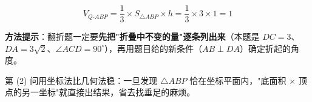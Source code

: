 \begin{answer}
\nopagebreak[4]
\[V_{Q\text{-}ABP}=\frac13\times S_{\triangle ABP}\times h=\frac13\times3\times1=1\]

\begin{gktip}
\textbf{方法提示}：翻折题一定要\textbf{先把"折叠中不变的量"逐条列出来}（本题是 $DC=3$、$DA=3\sqrt2$、$\angle ACD=90^\circ$），再用题目给的新条件（$AB\perp DA$）确定折起的角度。

第 (2) 问用坐标法比几何法稳：一旦发现 $\triangle ABP$ 恰在坐标平面内，"底面积 $\times$ 顶点的另一坐标"就直接出结果，省去找垂足的麻烦。
\end{gktip}



\par\medskip

\end{answer}
